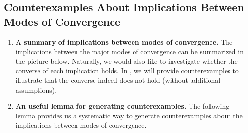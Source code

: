\subsection{Counterexamples About Implications Between Modes of Convergence}
\label{subsect:counterexamples}
\begin{enumerate}
\item \textbf{A summary of implications between modes of convergence.}
The implications between the major modes of convergence can be
summarized in the picture below. Naturally, we would also like to investigate
whether the converse of each implication holds. In
, we will provide counterexamples to illustrate
that the converse indeed does not hold (without additional assumptions).
\begin{center}
\end{center}
\item \textbf{An useful lemma for generating counterexamples.} The following
lemma provides us a systematic way to generate counterexamples about the
implications between modes of convergence.


\end{enumerate}
